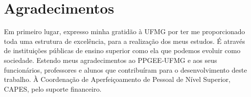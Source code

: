 \chapter*{Agradecimentos}
\thispagestyle{empty}
Em primeiro lugar, expresso minha gratidão à UFMG por ter me proporcionado toda uma estrutura de excelência, para a realização dos meus estudos. É através de instituições públicas de ensino superior como ela que podemos evoluir como sociedade. Estendo meus agradecimentos ao PPGEE-UFMG e aos seus funcionários, professores e alunos que contribuíram para o desenvolvimento deste trabalho. À Coordenação de Aperfeiçoamento de Pessoal de Nível Superior, CAPES, pelo suporte financeiro.

